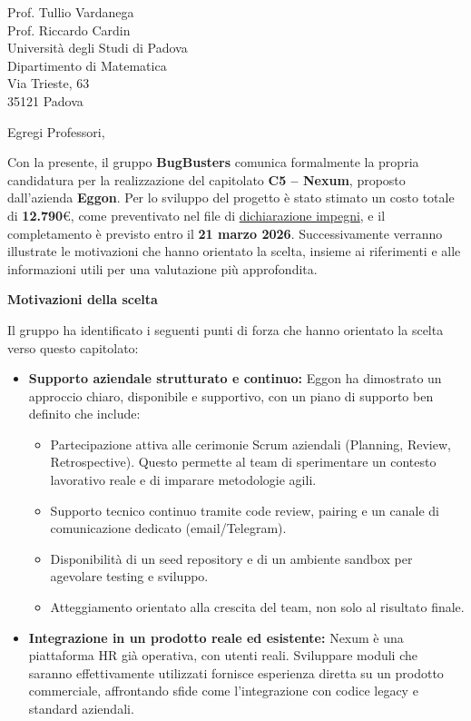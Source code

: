 \documentclass[a4paper,11pt]{letter}
\begin{document}
\begin{letter}{Prof. Tullio Vardanega\\Prof. Riccardo Cardin\\Universit\`a degli Studi di Padova\\Dipartimento di Matematica\\Via Trieste, 63\\35121 Padova}
\opening{Egregi Professori,}

Con la presente, il gruppo \textbf{BugBusters} comunica formalmente la propria candidatura per la realizzazione
 del capitolato \textbf{C5 -- Nexum}, proposto dall'azienda \textbf{Eggon}. 
 Per lo sviluppo del progetto è stato stimato un costo totale di \textbf{12.790}\euro , come preventivato nel file di 
 \href{https://bugbustersunipd.github.io/BugBusterSite/assets/docs/DICHIARAZIONE_IMPEGNI/Dichiarazione_impegni.pdf}{dichiarazione impegni},
  e il completamento è previsto entro il \textbf{21 marzo 2026}. Successivamente verranno illustrate le motivazioni che hanno 
 orientato la scelta, insieme ai riferimenti e alle informazioni utili per una valutazione 
 più approfondita.

\vspace{0.8em}

	\textbf{Motivazioni della scelta}


Il gruppo ha identificato i seguenti punti di forza che hanno orientato la scelta verso questo capitolato:

\begin{itemize}
    \item \textbf{Supporto aziendale strutturato e continuo:} Eggon ha dimostrato un approccio chiaro, disponibile e supportivo, con un piano di supporto ben definito che include:
    \begin{itemize}
        \item Partecipazione attiva alle cerimonie Scrum aziendali (Planning, Review, Retrospective). Questo permette al team di sperimentare un contesto lavorativo reale e di imparare metodologie agili.
        \item Supporto tecnico continuo tramite code review, pairing e un canale di comunicazione dedicato (email/Telegram).
        \item Disponibilità di un seed repository e di un ambiente sandbox per agevolare testing e sviluppo.
        \item Atteggiamento orientato alla crescita del team, non solo al risultato finale.
    \end{itemize}

    \item \textbf{Integrazione in un prodotto reale ed esistente:} Nexum è una piattaforma HR già operativa, con utenti reali. Sviluppare moduli che saranno effettivamente utilizzati fornisce esperienza diretta su un prodotto commerciale, affrontando sfide come l'integrazione con codice legacy e standard aziendali.


\end{itemize}
\end{letter}
\end{document}
